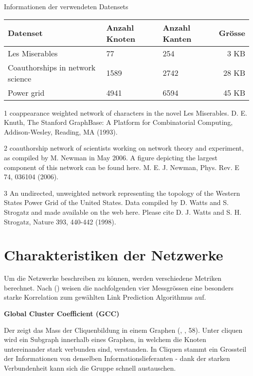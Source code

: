 \begin{threeparttable}
    \centering
    \label{dataset_info}
    \caption{Informationen der verwendeten Datensets}
    \begin{tabular}{@{}lllr@{}}
        \toprule
        Datenset                        & Anzahl Knoten & Anzahl Kanten & Grösse \\ \midrule
        Les Miserables\tnote{1}                 & 77     & 254 & 3 KB   \\
        Coauthorships in network science\tnote{2} & 1589    & 2742 & 28 KB     \\
        Power grid\tnote{3}                       & 4941   & 6594 & 45 KB   \\ \bottomrule
    \end{tabular}
    \begin{tablenotes}[\flushleft]
        \footnotesize
        \item[1] coappearance weighted network of characters in the novel Les Miserables. D. E. Knuth, The Stanford GraphBase: A Platform for Combinatorial Computing, Addison-Wesley, Reading, MA (1993).
        \item[2] coauthorship network of scientists working on network theory and experiment, as compiled by M. Newman in May 2006. A figure depicting the largest component of this network can be found here. M. E. J. Newman, Phys. Rev. E 74, 036104 (2006).
        \item[3] An undirected, unweighted network representing the topology of the Western States Power Grid of the United States. Data compiled by D. Watts and S. Strogatz and made available on the web here. Please cite D. J. Watts and S. H. Strogatz, Nature 393, 440-442 (1998).
    \end{tablenotes}
\end{threeparttable}

\section{Charakteristiken der Netzwerke}
Um die Netzwerke beschreiben zu können, werden verschiedene Metriken berechnet.
Nach \citeauthor{gao_link_2015} (\citeyear{gao_link_2015}) weisen die nachfolgenden vier Messgrössen eine besonders starke Korrelation zum gewählten Link Prediction Algorithmus auf.

\textbf{Global Cluster Coefficient (GCC)}

Der  zeigt das Mass der Cliquenbildung in einem Graphen (\citeauthor{michael_henninger_soziale_2018}, \citeyear{michael_henninger_soziale_2018}, 58).
Unter \acs{clique}n wird ein Subgraph innerhalb eines Graphen, in welchem die Knoten untereinander stark verbunden sind, verstanden.
In Cliquen stammt ein Grossteil der Informationen von denselben Informationslieferanten - dank der starken Verbundenheit kann sich die Gruppe schnell austauschen.

